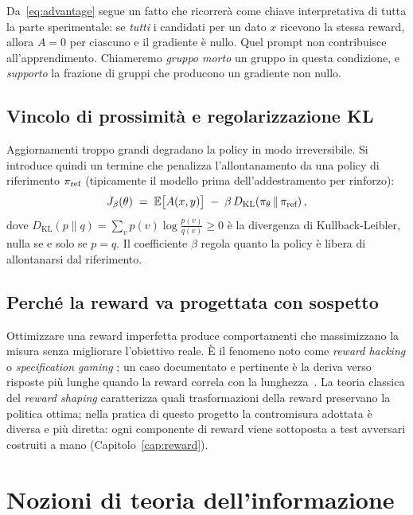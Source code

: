 Da~\eqref{eq:advantage} segue un fatto che ricorrerà come chiave interpretativa
di tutta la parte sperimentale: se \emph{tutti} i candidati per un dato $x$
ricevono la stessa reward, allora $A = 0$ per ciascuno e il gradiente è nullo.
Quel prompt non contribuisce all'apprendimento. Chiameremo \emph{gruppo morto}
un gruppo in questa condizione, e \emph{supporto} la frazione di gruppi che
producono un gradiente non nullo.

\subsection{Vincolo di prossimità e regolarizzazione KL}

Aggiornamenti troppo grandi degradano la policy in modo irreversibile. Si
introduce quindi un termine che penalizza l'allontanamento da una policy di
riferimento $\pi_{\text{ref}}$ (tipicamente il modello prima
dell'addestramento per rinforzo):
\begin{equation}
  \label{eq:kl}
  J_{\beta}(\theta)
  \;=\;
  \mathbb{E}\big[A(x,y)\big]
  \;-\;
  \beta \, D_{\mathrm{KL}}\!\left(\pi_\theta \,\|\, \pi_{\text{ref}}\right),
\end{equation}
dove $D_{\mathrm{KL}}(p\|q) = \sum_v p(v) \log \frac{p(v)}{q(v)} \ge 0$ è la
divergenza di Kullback-Leibler, nulla se e solo se $p = q$. Il coefficiente
$\beta$ regola quanto la policy è libera di allontanarsi dal riferimento.

\subsection{Perché la reward va progettata con sospetto}

Ottimizzare una reward imperfetta produce comportamenti che massimizzano la
misura senza migliorare l'obiettivo reale. È il fenomeno noto come
\emph{reward hacking} o \emph{specification gaming}
\cite{amodei2016concrete,gao2022overoptimization}; un caso documentato e
pertinente è la deriva verso risposte più lunghe quando la reward correla con la
lunghezza~\cite{singhal2023length}. La teoria classica del \emph{reward shaping}
\cite{ng1999shaping} caratterizza quali trasformazioni della reward preservano
la politica ottima; nella pratica di questo progetto la contromisura adottata è
diversa e più diretta: ogni componente di reward viene sottoposta a test
avversari costruiti a mano (Capitolo~\ref{cap:reward}).

\section{Nozioni di teoria dell'informazione}

